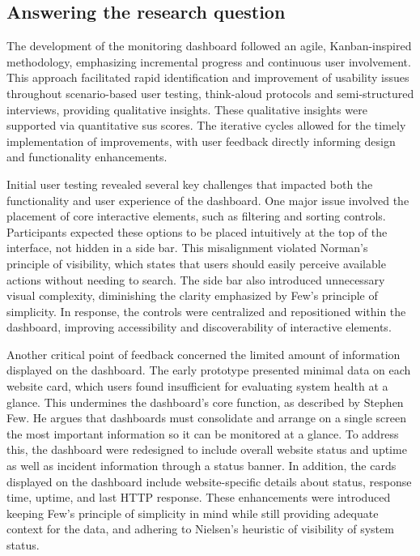 \subsection{Answering the research question}
\label{subsec:rq1_discussion}

The development of the monitoring dashboard followed an agile, Kanban-inspired methodology, emphasizing incremental progress and continuous user involvement. This approach facilitated rapid identification and improvement of usability issues throughout scenario-based user testing, think-aloud protocols and semi-structured interviews, providing qualitative insights. These qualitative insights were supported via quantitative \acrshort{sus} scores. The iterative cycles allowed for the timely implementation of improvements, with user feedback directly informing design and functionality enhancements. 

Initial user testing revealed several key challenges that impacted both the functionality and user experience of the dashboard. One major issue involved the placement of core interactive elements, such as filtering and sorting controls. Participants expected these options to be placed intuitively at the top of the interface, not hidden in a side bar. This misalignment violated Norman's principle of visibility, which states that users should easily perceive available actions without needing to search. The side bar also introduced unnecessary visual complexity, diminishing the clarity emphasized by Few's principle of simplicity. In response, the controls were centralized and repositioned within the dashboard, improving accessibility and discoverability of interactive elements. 

Another critical point of feedback concerned the limited amount of information displayed on the dashboard. The early prototype presented minimal data on each website card, which users found insufficient for evaluating system health at a glance. This undermines the dashboard's core function, as described by Stephen Few. He argues that dashboards must consolidate and arrange on a single screen the most important information so it can be monitored at a glance. To address this, the dashboard were redesigned to include overall website status and uptime as well as incident information through a status banner. In addition, the cards displayed on the dashboard include website-specific details about status, response time, uptime, and last HTTP response. These enhancements were introduced keeping Few's principle of simplicity in mind while still providing adequate context for the data, and adhering to Nielsen's heuristic of visibility of system status. 

